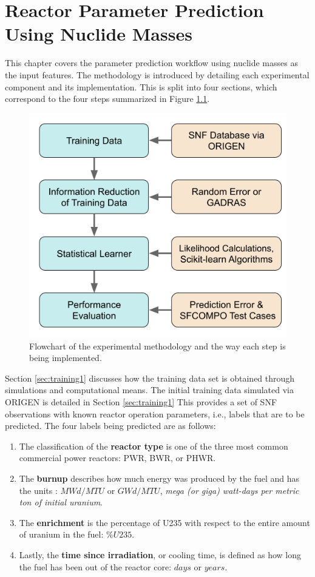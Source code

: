 
\glsresetall

\chapter{Reactor Parameter Prediction Using Nuclide Masses}
\label{ch:exp1}

This chapter covers the parameter prediction workflow using nuclide masses as
the input features. The methodology is introduced by detailing each
experimental component and its implementation. This is split into four
sections, which correspond to the four steps summarized in Figure
\ref{fig:method}.

\begin{figure}[!ht]
  \centering
  \includegraphics[width=0.7\linewidth]{./chapters/exp1/methodology.png}
  \caption{Flowchart of the experimental methodology and the way each step is being implemented.}
  \label{fig:method}
\end{figure}

Section \ref{sec:training1} discusses how the training data set is obtained
through simulations and computational means. The initial training data
simulated via \gls{ORIGEN} is detailed in Section \ref{sec:training1} This
provides a set of \gls{SNF} observations with known reactor operation
parameters, i.e., labels that are to be predicted. The four labels being
predicted are as follows:
\begin{enumerate}
  \item The classification of the \textbf{reactor type} is one of the three
  most common commercial power reactors: \gls{PWR}, \gls{BWR}, or \gls{PHWR}.
  \item The \textbf{burnup} describes how much energy was produced by the fuel
  and has the units : $MWd/MTU$ or $GWd/MTU$, \textit{mega (or giga) watt-days
  per metric ton of initial uranium}.
  \item The \textbf{enrichment} is the percentage of \gls{U235} with respect to
  the entire amount of uranium in the fuel: $\%U235$. 
  \item Lastly, the \textbf{time since irradiation}, or cooling time, is
  defined as how long the fuel has been out of the reactor core: $days$ or
  $years$.
\end{enumerate}


